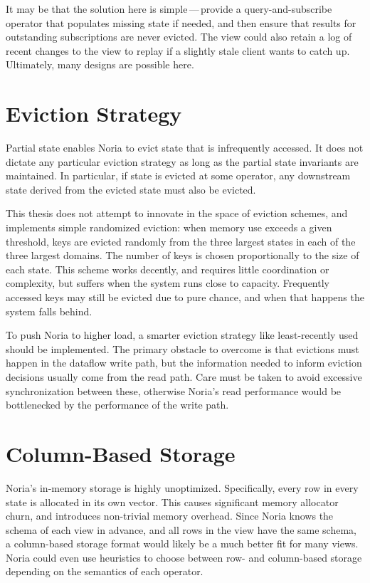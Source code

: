 It may be that the solution here is simple\,---\,provide a query-and-subscribe
operator that populates missing state if needed, and then ensure that results
for outstanding subscriptions are never evicted. The view could also retain a
log of recent changes to the view to replay if a slightly stale client wants to
catch up. Ultimately, many designs are possible here.

\section{Eviction Strategy}

Partial state enables Noria to evict state that is infrequently accessed. It
does not dictate any particular eviction strategy as long as the partial state
invariants are maintained. In particular, if state is evicted at some operator,
any downstream state derived from the evicted state must also be evicted.

This thesis does not attempt to innovate in the space of eviction schemes, and
implements simple randomized eviction: when memory use exceeds a given
threshold, keys are evicted randomly from the three largest states in each of
the three largest domains. The number of keys is chosen proportionally to the
size of each state. This scheme works decently, and requires little coordination
or complexity, but suffers when the system runs close to capacity. Frequently
accessed keys may still be evicted due to pure chance, and when that happens the
system falls behind.

To push Noria to higher load, a smarter eviction strategy like least-recently
used should be implemented. The primary obstacle to overcome is that evictions
must happen in the dataflow write path, but the information needed to inform
eviction decisions usually come from the read path. Care must be taken to avoid
excessive synchronization between these, otherwise Noria's read performance
would be bottlenecked by the performance of the write path.

\section{Column-Based Storage}

Noria's in-memory storage is highly unoptimized. Specifically, every row in
every state is allocated in its own vector. This causes significant memory
allocator churn, and introduces non-trivial memory overhead. Since Noria knows
the schema of each view in advance, and all rows in the view have the same
schema, a column-based storage format would likely be a much better fit for
many views. Noria could even use heuristics to choose between row- and
column-based storage depending on the semantics of each operator.

